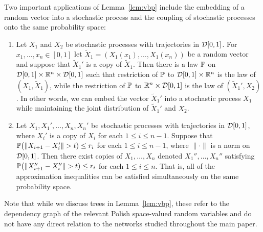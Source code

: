 \begin{remark}

  Two important applications of
  Lemma~\ref{lem:vbp} include
  the embedding of a random vector into a stochastic process
  and the coupling of stochastic processes
  onto the same probability space:
  \begin{enumerate}[label=(\roman*)]

    \item
      Let $X_1$ and $X_2$
      be stochastic processes with
      trajectories in $\cD[0,1]$.
      For $x_1, \ldots, x_n \in [0,1]$
      let $\tilde X_1 = (X_1(x_1), \ldots, X_1(x_n))$
      be a random vector
      and suppose that $\tilde X_1'$
      is a copy of $\tilde X_1$.
      Then there is a law $\P$ on
      $\cD[0,1] \times \R^n \times \cD[0,1]$
      such that restriction of $\P$ to
      $\cD[0,1] \times \R^n$
      is the law of $(X_1, \tilde X_1)$,
      while the restriction of $\P$ to
      $\R^n \times \cD[0,1]$
      is the law of $(\tilde X_1',X_2)$.
      In other words,
      we can embed the vector $\tilde X_1'$
      into a stochastic process $X_1$
      while maintaining the joint distribution of
      $\tilde X_1'$ and $X_2$.

    \item
      Let $X_1, X_1', \ldots, X_n, X_n'$
      be stochastic processes with
      trajectories in $\cD[0,1]$,
      where $X_i'$ is a copy of $X_i$
      for each $1 \leq i \leq n-1$.
      Suppose that
      $\P\big(\|X_{i+1} - X_i'\| > t)\leq r_i$
      for each $1 \leq i \leq n-1$,
      where $\|\cdot\|$ is a norm on $\cD[0,1]$.
      Then there exist copies of
      $X_1, \ldots, X_n$
      denoted
      $X_1'', \ldots, X_n''$
      satisfying
      $\P\big(\|X_{i+1}'' - X_i''\| > t)\leq r_i$
      for each $1 \leq i \leq n$.
      That is, all of the approximation inequalities
      can be satisfied simultaneously
      on the same probability space.

  \end{enumerate}

\end{remark}

\begin{remark}
  Note that while we discuss trees in
  Lemma~\ref{lem:vbp},
  these refer to the dependency graph of the relevant
  Polish space-valued random variables and do not
  have any direct relation to the
  networks studied throughout the main paper.
\end{remark}

